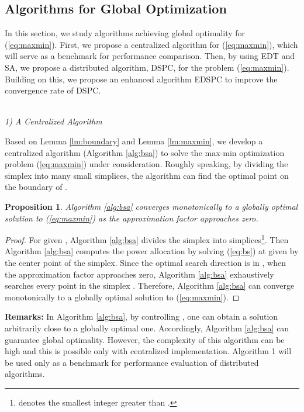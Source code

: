 \documentclass[10pt,journal,letterpaper,compsoc]{IEEEtran}
\newtheorem{prop}{\textbf{Proposition}}[section]
\begin{document}
\subsection{Algorithms for Global Optimization}
In this section, we study algorithms achieving global optimality for (\ref{eq:maxmin}). First, we propose a centralized algorithm for (\ref{eq:maxmin}),
which will serve as a benchmark for performance comparison. Then, by using EDT and SA, we propose a distributed algorithm, DSPC, for the problem (\ref{eq:maxmin}). Building on this, we propose an enhanced algorithm EDSPC to improve the convergence rate of DSPC.
\\
\\
\noindent
{\emph{1) A Centralized Algorithm}

Based on Lemma \ref{lm:boundary} and Lemma \ref{lm:maxmin}, we develop a centralized algorithm (Algorithm \ref{alg:bsa}) to solve the max-min optimization problem (\ref{eq:maxmin}) under consideration. Roughly speaking, by dividing the simplex  into many small simplices, the algorithm can find the optimal point on the boundary of .

\begin{prop}
Algorithm \ref{alg:bsa} converges monotonically to a globally optimal solution to (\ref{eq:maxmin}) as the approximation factor  approaches zero.
\end{prop}
\begin{proof}
For given , Algorithm \ref{alg:bsa} divides the simplex  into  simplices\footnote{ denotes the smallest integer greater than .}. Then Algorithm \ref{alg:bsa} computes the power allocation  by solving (\ref{eq:bs}) at  given by the center point of the simplex. Since the optimal search direction  is in , when the approximation factor  approaches zero, Algorithm \ref{alg:bsa} exhaustively searches every point in the simplex . Therefore, Algorithm \ref{alg:bsa} can converge monotonically to a globally optimal solution to (\ref{eq:maxmin}).
\end{proof}

{\bf Remarks:} In Algorithm \ref{alg:bsa},   by controlling , one can obtain a solution arbitrarily close to a globally optimal one.
  Accordingly, Algorithm \ref{alg:bsa} can guarantee global optimality. However, the complexity of this algorithm can be high and this is possible only with centralized implementation. Algorithm 1 will be used only as a benchmark for performance evaluation of distributed algorithms.

}
\end{document}
